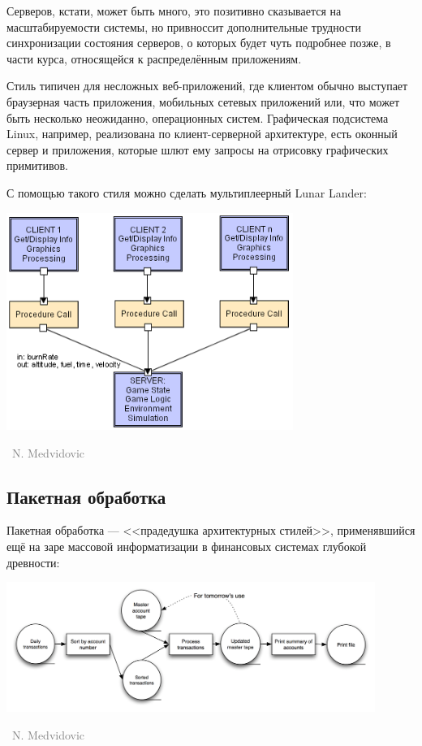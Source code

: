 \documentclass[a5paper]{article}
\newcommand{\attribution}[1] {
    \vspace{-4mm}\begin{flushright}\begin{scriptsize}\textcolor{gray}
    {\textcopyright\, #1}\end{scriptsize}\end{flushright}
}
\begin{document}
Серверов, кстати, может быть много, это позитивно сказывается на масштабируемости системы, но привноссит дополнительные трудности синхронизации состояния серверов, о которых будет чуть подробнее позже, в части курса, относящейся к распределённым приложениям.

Стиль типичен для несложных веб-приложений, где клиентом обычно выступает браузерная часть приложения, мобильных сетевых приложений или, что может быть несколько неожиданно, операционных систем. Графическая подсистема Linux, например, реализована по клиент-серверной архитектуре, есть оконный сервер и приложения, которые шлют ему запросы на отрисовку графических примитивов.

С помощью такого стиля можно сделать мультиплеерный Lunar Lander:

\begin{center}
    \includegraphics[width=0.7\textwidth]{clientServerLL.png}
    \attribution{N. Medvidovic}
\end{center}

\subsection{Пакетная обработка}

Пакетная обработка --- <<прадедушка архитектурных стилей>>, применявшийся ещё на заре массовой информатизации в финансовых системах глубокой древности:

\begin{center}
    \includegraphics[width=0.9\textwidth]{batch.png}
    \attribution{N. Medvidovic}
\end{center}
\end{document}
